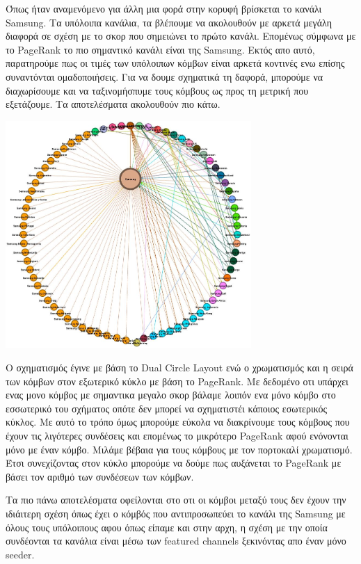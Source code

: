 \documentclass[12pt]{article}
\begin{document}
	\newpage
	Όπως ήταν αναμενόμενο για άλλη μια φορά στην κορυφή βρίσκεται το κανάλι Samsung. Τα υπόλοιπα κανάλια, τα βλέπουμε να ακολουθούν με αρκετά μεγάλη διαφορά σε σχέση με το σκορ που σημειώνει το πρώτο κανάλι. Επομένως σύμφωνα με το PageRank το πιο σημαντικό κανάλι είναι της Samsung. Εκτός απο αυτό, παρατηρούμε πως οι τιμές των υπόλοιπων κόμβων είναι αρκετά κοντινές ενω επίσης συναντόνται ομαδοποιήσεις. Για να δουμε σχηματικά τη δαφορά, μπορούμε να διαχωρίσουμε και να ταξινομήσπυμε τους κόμβους ως προς τη μετρική που εξετάζουμε. Τα αποτελέσματα ακολουθούν πιο κάτω.
	\vspace{12pt}
	\begin{center}
		\includegraphics[width=0.7\textwidth]{photos-files/section13/layout.JPG}
	\end{center}
	\vspace{12pt}
	Ο σχηματισμός έγινε με βάση το Dual Circle Layout ενώ ο χρωματισμός και η σειρά των κόμβων στον εξωτερικό κύκλο με βάση το PageRank. Με δεδομένο οτι υπάρχει ενας μονο κόμβος με σημαντικα μεγαλο σκορ βάλαμε λοιπόν ενα μόνο κόμβο στο εσσωτερικό του σχήματος οπότε δεν μπορεί να σχηματιστέι κάποιος εσωτερικός κύκλος. Με αυτό το τρόπο όμως μπορούμε εύκολα να διακρίνουμε τους κόμβους που έχουν τις λιγότερες συνδέσεις και επομένως το μικρότερο PageRank αφού ενόνονται μόνο με έναν κόμβο. Μιλάμε βέβαια για τους κόμβους με τον πορτοκαλί χρωματισμό. Έτσι συνεχίζοντας στον κύκλο μπορούμε να δούμε πως αυξάνεται το PageRank με βάσει τον αριθμό των συνδέσεων των κόμβων.
	
	Τα πιο πάνω αποτελέσματα οφείλονται στο οτι οι κόμβοι μεταξύ τους δεν έχουν την ιδιάιτερη σχέση όπως έχει ο κόμβός που αντιπροσωπεύει το κανάλι της Samsung με όλους τους υπόλοιπους αφου όπως είπαμε και στην αρχη, η σχέση με την οποία συνδέονται τα κανάλια είναι μέσω των featured channels ξεκινόντας απο έναν μόνο seeder.
	
\end{document}
